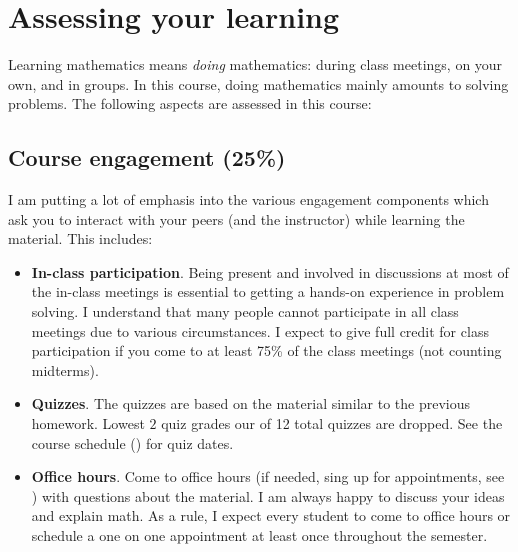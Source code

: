 \documentclass[oneside,11pt]{amsart}
\begin{document}
%

\section{Assessing your learning}

Learning mathematics means \emph{doing} mathematics: during class meetings, on your own, and in groups.
In this course, doing mathematics mainly amounts to solving problems.
The following aspects are assessed in this course:

\subsection{Course engagement (25\%)}

I am putting a lot of emphasis
into the various engagement components which ask you to interact with 
your peers (and the instructor) while learning the material. This includes:

\begin{itemize}
	\item \textbf{In-class participation}. 
		Being present and involved in discussions at most of the in-class meetings
		is essential to getting a hands-on experience 
		in problem solving. 
		I understand that many people cannot participate in all class meetings due to various
		circumstances. 
		I expect to give full credit for class participation 
		if you come to at least 75\% of the class meetings (not counting midterms).
	\item \textbf{Quizzes}. 
		The quizzes are based on the material similar to the previous homework.
		Lowest $2$ quiz grades our of 12 total quizzes are dropped.
		See the course schedule () for quiz dates.
	\item \textbf{Office hours}. Come to office hours (if needed, 
		sing up for appointments, see ) 
		with questions about the material.
		I am always happy to discuss your ideas and explain math.
		As a rule, I expect every student to come to office hours or schedule a one on one appointment
		at least once throughout the semester.
\end{itemize}
\end{document}
